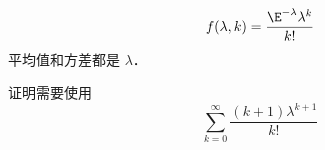 
\begin{issues}
\issueDraft
\end{issues}

\begin{equation}
f(\lambda, k) = \frac{\E^{-\lambda}\lambda^k}{k!}
\end{equation}
平均值和方差都是 $\lambda$．

证明需要使用
\begin{equation}
\sum_{k=0}^\infty \frac{(k+1)\lambda^{k+1}}{k!}
\end{equation}

